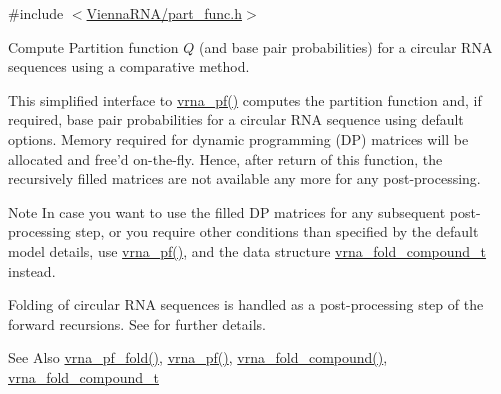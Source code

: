 {\ttfamily \#include $<$\hyperlink{part__func_8h}{Vienna\-R\-N\-A/part\-\_\-func.\-h}$>$}



Compute Partition function $Q$ (and base pair probabilities) for a circular R\-N\-A sequences using a comparative method. 

This simplified interface to \hyperlink{group__pf__fold_ga29e256d688ad221b78d37f427e0e99bc}{vrna\-\_\-pf()} computes the partition function and, if required, base pair probabilities for a circular R\-N\-A sequence using default options. Memory required for dynamic programming (D\-P) matrices will be allocated and free'd on-\/the-\/fly. Hence, after return of this function, the recursively filled matrices are not available any more for any post-\/processing.

\begin{DoxyNote}{Note}
In case you want to use the filled D\-P matrices for any subsequent post-\/processing step, or you require other conditions than specified by the default model details, use \hyperlink{group__pf__fold_ga29e256d688ad221b78d37f427e0e99bc}{vrna\-\_\-pf()}, and the data structure \hyperlink{group__fold__compound_ga1b0cef17fd40466cef5968eaeeff6166}{vrna\-\_\-fold\-\_\-compound\-\_\-t} instead.
\end{DoxyNote}
Folding of circular R\-N\-A sequences is handled as a post-\/processing step of the forward recursions. See \cite{hofacker:2006} for further details.

\begin{DoxySeeAlso}{See Also}
\hyperlink{group__pf__fold_ga59935ba485ac90f0efb5a38e2962d879}{vrna\-\_\-pf\-\_\-fold()}, \hyperlink{group__pf__fold_ga29e256d688ad221b78d37f427e0e99bc}{vrna\-\_\-pf()}, \hyperlink{group__fold__compound_ga6601d994ba32b11511b36f68b08403be}{vrna\-\_\-fold\-\_\-compound()}, \hyperlink{group__fold__compound_ga1b0cef17fd40466cef5968eaeeff6166}{vrna\-\_\-fold\-\_\-compound\-\_\-t}
\end{DoxySeeAlso}

